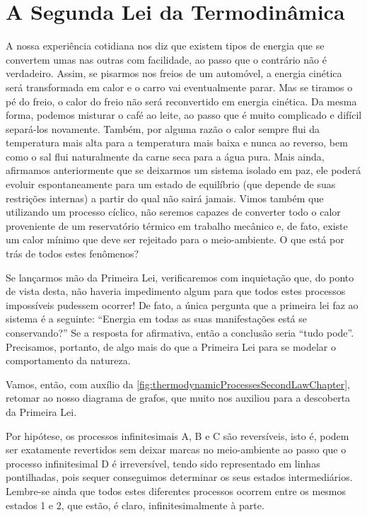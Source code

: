 \chapter{A Segunda Lei da Termodinâmica}
\label{chap:theSecondLaw}

    A nossa experiência cotidiana nos diz que existem tipos de energia que se
    convertem umas nas outras com facilidade, ao passo que o contrário não é
    verdadeiro. Assim, se pisarmos nos freios de um automóvel, a energia
    cinética será transformada em calor e o carro vai eventualmente parar. Mas
    se tiramos o pé do freio, o calor do freio não será reconvertido em energia
    cinética. Da mesma forma, podemos misturar o café ao leite, ao passo que é
    muito complicado e difícil separá-los novamente. Também, por alguma razão o
    calor sempre flui da temperatura mais alta para a temperatura mais baixa e
    nunca ao reverso, bem como o sal flui naturalmente da carne seca para a
    água pura. Mais ainda, afirmamos anteriormente que se deixarmos um sistema
    isolado em paz, ele poderá evoluir espontaneamente para um estado de
    equilíbrio (que depende de suas restrições internas) a partir do qual não
    sairá jamais. Vimos também que utilizando um processo cíclico, não seremos
    capazes de converter todo o calor proveniente de um reservatório térmico em
    trabalho mecânico e, de fato, existe um calor mínimo que deve ser rejeitado
    para o meio-ambiente. O que está por trás de todos estes fenômenos?

    Se lançarmos mão da Primeira Lei, verificaremos com inquietação que, do
    ponto de vista desta, não haveria impedimento algum para que todos estes
    processos impossíveis pudessem ocorrer! De fato, a única pergunta que a
    primeira lei faz ao sistema é a seguinte: \enquote{Energia em todas as suas
    manifestações está se conservando?} Se a resposta for afirmativa, então a
    conclusão seria \enquote{tudo pode}. Precisamos, portanto, de algo mais do
    que a Primeira Lei para se modelar o comportamento da natureza.

    Vamos, então, com auxílio da
    \cref{fig:thermodynamicProcessesSecondLawChapter}, retomar ao nosso
    diagrama de grafos, que muito nos auxiliou para a descoberta da Primeira
    Lei.

    Por hipótese, os processos infinitesimais A, B e C são reversíveis, isto é,
    podem ser exatamente revertidos sem deixar marcas no meio-ambiente ao passo
    que o processo infinitesimal D é irreversível, tendo sido representado em
    linhas pontilhadas, pois sequer conseguimos determinar os seus estados
    intermediários. Lembre-se ainda que todos estes diferentes processos
    ocorrem entre os mesmos estados 1 e 2, que estão, é claro,
    infinitesimalmente à parte.

